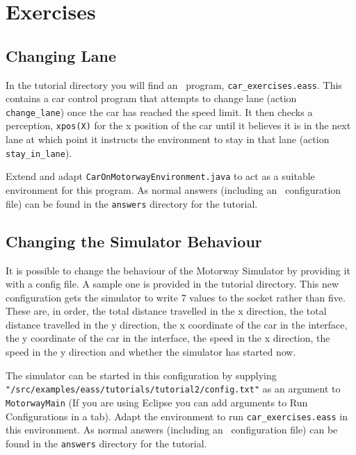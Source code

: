 \section{Exercises}
\subsection{Changing Lane}
\begin{sloppypar}
In the tutorial directory you will find an \eass\ program, \texttt{car\_exercises.eass}.  This contains a car control program that attempts to change lane (action \lstinline{change_lane}) once the car has reached the speed limit.  It then checks a perception, \lstinline{xpos(X)} for the x position of the car until it believes it is in the next lane at which point it instructs the environment to stay in that lane (action \lstinline{stay_in_lane}).
\end{sloppypar}

Extend and adapt \texttt{CarOnMotorwayEnvironment.java} to act as a suitable environment for this program.  As normal answers (including an \ail\ configuration file) can be found in the \texttt{answers} directory for the tutorial.

\subsection{Changing the Simulator Behaviour}
It is possible to change the behaviour of the Motorway Simulator by providing it with a config file.  A sample one is provided in the tutorial directory.  This new configuration gets the simulator to write 7 values to the socket rather than five.  These are, in order, the total distance travelled in the x direction, the total distance travelled in the y direction, the x coordinate of the car in the interface, the y coordinate of the car in the interface, the speed in the x direction, the speed in the y direction and whether the simulator has started now.

\begin{sloppypar}
The simulator can be started in this configuration by supplying \texttt{"/src/examples/eass/tutorials/tutorial2/config.txt"} as an argument to \texttt{MotorwayMain} (If you are using Eclipse you can add arguments to Run Configurations in a tab).  Adapt the environment to run \texttt{car\_exercises.eass} in this environment.  As normal answers (including an \ail\ configuration file) can be found in the \texttt{answers} directory for the tutorial.
\end{sloppypar}
